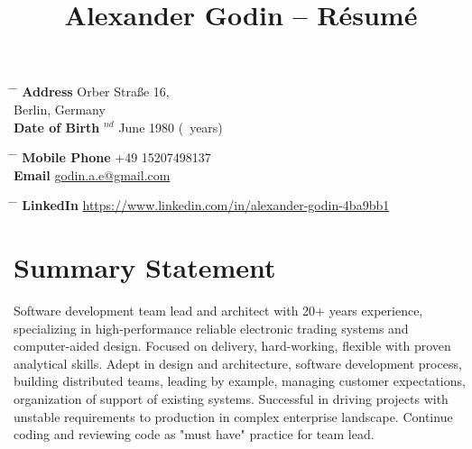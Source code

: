 \documentclass[10pt]{article} %
\begin{document}

\title{Alexander Godin -- Résumé} %


\parbox{0.5\textwidth}{
\begin{tabbing} %
\hspace{3cm} \= \hspace{4cm} \= \kill %
{\bf Address} \> Orber Straße 16, \\ %
 Berlin, Germany \\ %
{\bf Date of Birth} $^{nd}$ June 1980 (\myage\ years)\\ %
\end{tabbing}}
\vspace{-10mm}
\hfill
\parbox{0.5\textwidth}{
\begin{tabbing}
\hspace{3cm} \= \hspace{4cm} \= \kill %
{\bf Mobile Phone} \> +49 15207498137 \\ %
{\bf Email} \> \href{mailto:godin.a.e@gmail.com}{godin.a.e@gmail.com}
\end{tabbing}}
\parbox{0.5\textwidth}{
\begin{tabbing}
\hspace{3cm} \= \hspace{4cm} \= \kill %
{\bf LinkedIn} \> \href{https://www.linkedin.com/in/alexander-godin-4ba9bb1}{https://www.linkedin.com/in/alexander-godin-4ba9bb1}
\end{tabbing}}


\section{Summary Statement}

Software development team lead and architect with 20+ years experience, specializing 
in high-performance reliable electronic trading systems and computer-aided design.
Focused on delivery, hard-working, flexible with proven analytical skills. Adept in design
and architecture, software development process, building distributed teams, leading by example,
managing customer expectations, organization of support of existing systems. Successful in
driving projects with unstable requirements to production in complex enterprise landscape.
Continue coding and reviewing code as "must have" practice for team lead. \\
\end{document}
